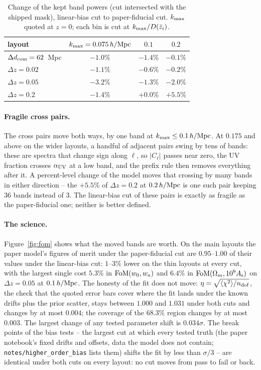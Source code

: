 \documentclass[11pt]{article}
\newcommand{\kmax}{k_{\rm max}}
\newcommand{\hMpc}{\,h/{\rm Mpc}}
\newcommand{\auv}{\alpha_{\rm UV}}
\newcommand{\dcom}{$\Delta d_{\rm com} = 62$~Mpc}
\newcommand{\us}{\_\allowbreak}
\newcommand{\kmaxclause}{$\kmax$ quoted at $z = 0$; each bin is cut at
  $\kmax/D(\bar{z}_i)$.}
\begin{document}
\begin{table}[tbp]
  \centering
  \begin{tabular}{lccc}
    \hline
    layout & $\kmax = 0.075\hMpc$ & $0.1$ & $0.2$ \\
    \hline
    \dcom{}           & $-1.0\%$ & $-1.4\%$ & $-0.1\%$ \\
    $\Delta z = 0.02$ & $-1.1\%$ & $-0.6\%$ & $-0.2\%$ \\
    $\Delta z = 0.05$ & $-3.2\%$ & $-1.3\%$ & $-2.0\%$ \\
    $\Delta z = 0.2$  & $-1.4\%$ & $+0.0\%$ & $+5.5\%$ \\
    \hline
  \end{tabular}
  \caption{Change of the kept band powers (cut intersected with the
    shipped mask), linear-bias cut to paper-fiducial cut.
    \kmaxclause}
  \label{tab:kept}
\end{table}

\paragraph{Fragile cross pairs.}
The cross pairs move both ways, by one band at
$\kmax \le 0.1\hMpc$.  At $0.175$ and above on the wider layouts, a
handful of adjacent pairs swing by tens of bands: these are spectra
that change sign along $\ell$, so $|C_\ell|$ passes near zero, the
UV fraction crosses $\auv$ at a low band, and the prefix rule then
removes everything after it.  A percent-level change of the model
moves that crossing by many bands in either direction -- the
$+5.5\%$ of $\Delta z = 0.2$ at $0.2\hMpc$ is one such pair keeping
$36$ bands instead of $3$.  The linear-bias cut of these pairs is
exactly as fragile as the paper-fiducial one; neither is better
defined.

\paragraph{The science.}
Figure~\ref{fig:fom} shows what the moved bands are worth.  On the
main layouts the paper model's figures of merit under the
paper-fiducial cut are $0.95$--$1.00$ of their values under the
linear-bias cut: $1$--$3\%$ lower on the thin layouts at every cut,
with the largest single cost $5.3\%$ in ${\rm FoM}(w_0, w_a)$ and
$6.4\%$ in ${\rm FoM}(\Omega_m, 10^9 A_{\rm s})$ on
$\Delta z = 0.05$ at $0.1\hMpc$.  The honesty of the fit does not
move: $\eta = \sqrt{\langle\chi^2\rangle/n_{\rm dof}}$, the check
that the quoted error bars cover where the fit lands under the
known drifts plus the prior scatter, stays between $1.000$ and
$1.031$ under both cuts and changes by at most $0.004$; the
coverage of the $68.3\%$ region changes by at most $0.003$.  The
largest change of any tested parameter shift is $0.034\sigma$.  The
break points of the bias tests -- the largest cut at which every
tested truth (the paper notebook's fixed drifts and offsets, data the
model does not contain; \texttt{notes/higher\us order\us bias} lists
them) shifts the fit by less than $\sigma/3$ -- are identical
under both cuts on every layout: no cut moves from pass to fail or
back.
\end{document}
